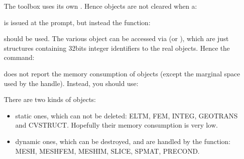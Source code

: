 \documentclass[a4paper,11pt,english]{sphinxmanual}
\begin{document}
\sphinxAtStartPar
The  toolbox uses its own . Hence  objects
are not cleared when a:

\begin{sphinxVerbatim}[commandchars=\\\{\}]
\end{sphinxVerbatim}

\sphinxAtStartPar
is issued at the  prompt, but instead the function:

\begin{sphinxVerbatim}[commandchars=\\\{\}]
\end{sphinxVerbatim}

\sphinxAtStartPar
should be used. The various  object can be accessed via  (or
), which are just  structures containing 32\sphinxhyphen{}bits integer
identifiers to the real objects. Hence the  command:

\begin{sphinxVerbatim}[commandchars=\\\{\}]
\end{sphinxVerbatim}

\sphinxAtStartPar
does not report the memory consumption of  objects (except the marginal space
used by the handle). Instead, you should use:

\begin{sphinxVerbatim}[commandchars=\\\{\}]
\end{sphinxVerbatim}

\sphinxAtStartPar
There are two kinds of  objects:
\begin{itemize}
\item {} 
\sphinxAtStartPar
static ones, which can not be deleted: ELTM, FEM, INTEG, GEOTRANS and CVSTRUCT.
Hopefully their memory consumption is very low.

\item {} 
\sphinxAtStartPar
dynamic ones, which can be destroyed, and are handled by the 
function: MESH, MESHFEM, MESHIM, SLICE, SPMAT, PRECOND.

\end{itemize}
\end{document}
